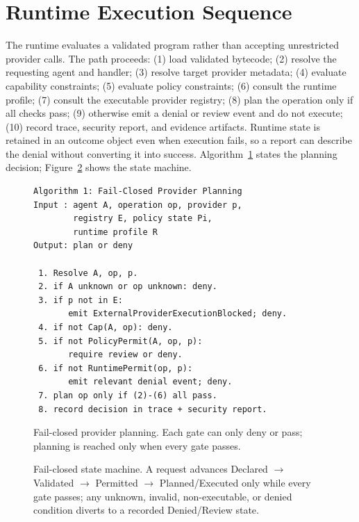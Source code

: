\documentclass[conference]{IEEEtran}
\begin{document}
\section{Runtime Execution Sequence}\label{sec:sequence}
The runtime evaluates a validated program rather than accepting unrestricted provider
calls. The path proceeds: (1) load validated bytecode; (2) resolve the requesting agent
and handler; (3) resolve target provider metadata; (4) evaluate capability constraints;
(5) evaluate policy constraints; (6) consult the runtime profile; (7) consult the
executable provider registry; (8) plan the operation only if all checks pass; (9)
otherwise emit a denial or review event and do not execute; (10) record trace, security
report, and evidence artifacts. Runtime state is retained in an outcome object even when
execution fails, so a report can describe the denial without converting it into success.
Algorithm~\ref{alg:plan} states the planning decision; Figure~\ref{fig:fsm} shows the
state machine.

\begin{figure}[t]
\begin{lstlisting}
Algorithm 1: Fail-Closed Provider Planning
Input : agent A, operation op, provider p,
        registry E, policy state Pi,
        runtime profile R
Output: plan or deny

 1. Resolve A, op, p.
 2. if A unknown or op unknown: deny.
 3. if p not in E:
       emit ExternalProviderExecutionBlocked; deny.
 4. if not Cap(A, op): deny.
 5. if not PolicyPermit(A, op, p):
       require review or deny.
 6. if not RuntimePermit(op, p):
       emit relevant denial event; deny.
 7. plan op only if (2)-(6) all pass.
 8. record decision in trace + security report.
\end{lstlisting}
\caption{Fail-closed provider planning. Each gate can only deny or pass; planning is
reached only when every gate passes.}
\label{alg:plan}
\end{figure}

\begin{figure}[t]
\centering
{}
\caption{Fail-closed state machine. A request advances Declared $\to$ Validated $\to$
Permitted $\to$ Planned/Executed only while every gate passes; any unknown, invalid,
non-executable, or denied condition diverts to a recorded Denied/Review state.}
\label{fig:fsm}
\end{figure}
\end{document}
